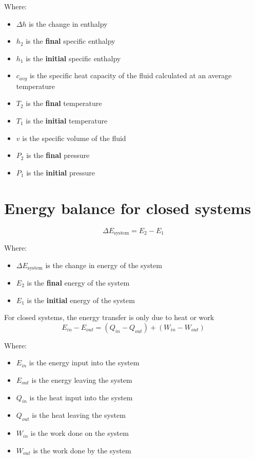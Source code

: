 \documentclass[11pt]{article}
\begin{document}
Where:
\begin{itemize}
\item \(\Delta h\) is the change in enthalpy
\item \(h_2\) is the \textbf{final} specific enthalpy
\item \(h_1\) is the \textbf{initial} specific enthalpy
\item \(c_{avg}\) is the specific heat capacity of the fluid calculated at an average temperature
\item \(T_2\) is the \textbf{final} temperature
\item \(T_1\) is the \textbf{initial} temperature
\item \(v\) is the specific volume of the fluid
\item \(P_2\) is the \textbf{final} pressure
\item \(P_1\) is the \textbf{initial} pressure
\end{itemize}

\newpage
\section{Energy balance for closed systems}
\label{sec:org87d6f0b}
\[\Delta E_{\text{system}} = E_2 - E_1\]

Where:
\begin{itemize}
\item \(\Delta E_{\text{system}}\) is the change in energy of the system
\item \(E_2\) is the \textbf{final} energy of the system
\item \(E_1\) is the \textbf{initial} energy of the system
\end{itemize}

For closed systems, the energy transfer is only due to heat or work
\[E_{in} - E_{out} = (Q_{in} - Q_{out}) + (W_{in} - W_{out})\]

Where:
\begin{itemize}
\item \(E_{in}\) is the energy input into the system
\item \(E_{out}\) is the energy leaving the system
\item \(Q_{in}\) is the heat input into the system
\item \(Q_{out}\) is the heat leaving the system
\item \(W_{in}\) is the work done on the system
\item \(W_{out}\) is the work done by the system
\end{itemize}
\end{document}
